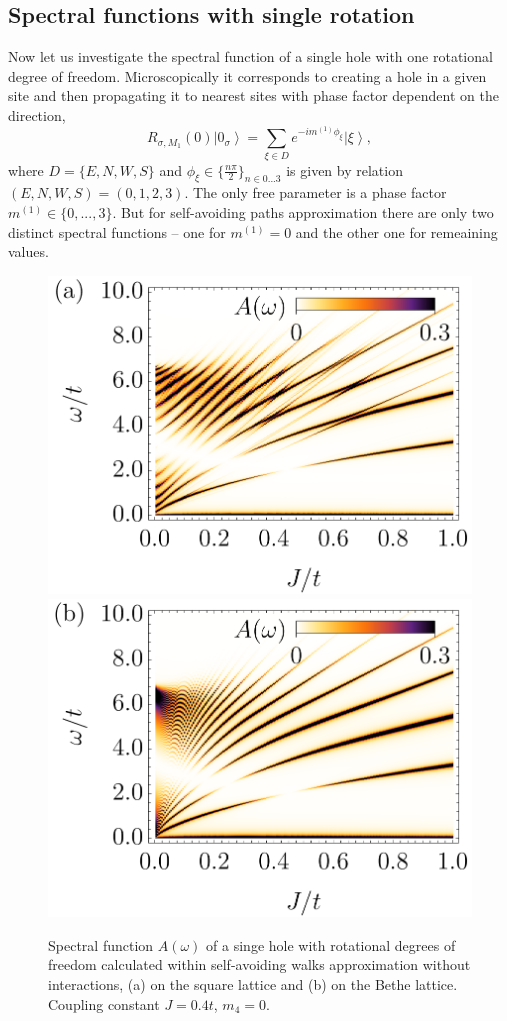 \documentclass[%
 reprint,
 amsmath,amssymb,
 aps,
prb,
floatfix,
]{revtex4-1}
\newcommand{\ket}[1]{\left\vert #1 \right\rangle}
\begin{document}
\subsection{\label{sec:results:one_rot}Spectral functions with single rotation}

Now let us investigate the spectral function of a single hole with one rotational degree of freedom. Microscopically it corresponds to creating a hole in a given site and then propagating it to nearest sites with phase factor dependent on the direction,
\begin{equation}
	R_{\sigma,M_1}(0) \ket{0_\sigma} = \sum_{\xi \in D} e^{-i m^{(1)} \phi_\xi} \ket{\xi},
\end{equation}
where $D = \{E,N,W,S\}$ and $\phi_\xi \in \{\frac{n\pi}{2}\}_{n\in0...3}$ is given by relation $(E,N,W,S) = (0,1,2,3)$. The only free parameter is a phase factor $m^{(1)} \in \{0,...,3\}$. But for self-avoiding paths approximation there are only two distinct spectral functions -- one for $m^{(1)} = 0$ and the other one for remeaining values.

\begin{figure}[ht!]
	\includegraphics[width=0.49\columnwidth]
	{./figures/square/[0]_noint.png}
	\includegraphics[width=0.49\columnwidth]
	{./figures/bethe/[0]_noint.png}
	\caption{
		Spectral function $A(\omega)$ of a singe hole with rotational degrees of freedom calculated within self-avoiding walks approximation without interactions, (a) on the square lattice and (b) on the Bethe lattice. Coupling constant $J=0.4t$, $m_4 = 0$.
	}\label{fig:rot_0_no_mag}
\end{figure}
\end{document}
